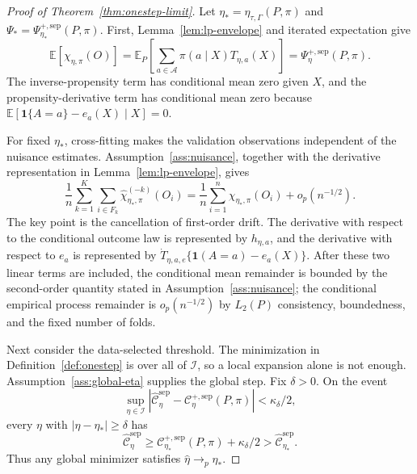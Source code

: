 \documentclass[11pt]{article}
\newcommand{\E}{\mathbb{E}}
\newcommand{\one}{\mathbf{1}}
\theoremstyle{definition}
\theoremstyle{plain}
\theoremstyle{remark}
\begin{document}
\begin{proof}[Proof of Theorem~\ref{thm:onestep-limit}]
Let \(\eta_*=\eta_{\tau,\Gamma}(P,\pi)\) and
\(\Psi_*=\Psi_{\eta_*}^{+,\mathrm{sep}}(P,\pi)\).  First,
Lemma~\ref{lem:lp-envelope} and iterated expectation give
\[
\E[\chi_{\eta,\pi}(O)]
=
\E_P\left[
\sum_{a\in\mathcal A}\pi(a\mid X)T_{\eta,a}(X)
\right]
=
\Psi_\eta^{+,\mathrm{sep}}(P,\pi).
\]
The inverse-propensity term has conditional mean zero given \(X\), and the
propensity-derivative term has conditional mean zero because
\(\E[\one\{A=a\}-e_a(X)\mid X]=0\).

For fixed \(\eta_*\), cross-fitting makes the validation observations
independent of the nuisance estimates.  Assumption~\ref{ass:nuisance}, together
with the derivative representation in Lemma~\ref{lem:lp-envelope}, gives
\[
\frac1n\sum_{k=1}^K\sum_{i\in F_k}
\widehat\chi_{\eta_*,\pi}^{(-k)}(O_i)
=
\frac1n\sum_{i=1}^n
\chi_{\eta_*,\pi}(O_i)
+
o_p(n^{-1/2}).
\]
The key point is the cancellation of first-order drift.  The derivative with
respect to the conditional outcome law is represented by \(h_{\eta,a}\), and the
derivative with respect to \(e_a\) is represented by
\(\dot T_{\eta,a,e}\{\one(A=a)-e_a(X)\}\).  After these two linear terms are
included, the conditional mean remainder is bounded by the second-order
quantity stated in Assumption~\ref{ass:nuisance}; the conditional empirical
process remainder is \(o_p(n^{-1/2})\) by \(L_2(P)\) consistency, boundedness,
and the fixed number of folds.

Next consider the data-selected threshold.  The minimization in
Definition~\ref{def:onestep} is over all of \(\mathcal I\), so a local
expansion alone is not enough.  Assumption~\ref{ass:global-eta} supplies the
global step.  Fix \(\delta>0\).  On the event
\[
\sup_{\eta\in\mathcal I}
\left|
\widehat{\mathcal C}_{\eta}^{\mathrm{sep}}
-
\mathcal C_{\eta}^{+,\mathrm{sep}}(P,\pi)
\right|
<
\kappa_\delta/2,
\]
every \(\eta\) with \(|\eta-\eta_*|\ge\delta\) has
\[
\widehat{\mathcal C}_{\eta}^{\mathrm{sep}}
\ge
\mathcal C_{\eta_*}^{+,\mathrm{sep}}(P,\pi)+\kappa_\delta/2
>
\widehat{\mathcal C}_{\eta_*}^{\mathrm{sep}}.
\]
Thus any global minimizer satisfies
\(\widehat\eta\to_p\eta_*\).


\end{proof}
\end{document}
